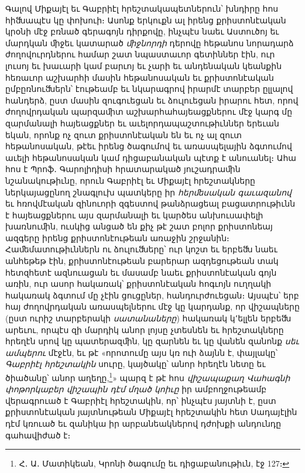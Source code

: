 \documentclass{article}
\begin{document}
{Գալով Միքայէլ եւ Գաբրիէլ հրեշտակապետներուն՝ խնդիրը հոս հիﬓապէս կը փոխուի։ Ասոնք երկուքն ալ իրենց քրիստոնէական կրօնի մէջ բռնած գերագոյն դիրքովը, ինչպէս նաեւ Աստուծոյ եւ մարդկան ﬕջեւ կատարած \emph{ﬕջնորդի} դերովը հեթանոս նորադարձ ժողովուրդներու համար շատ նպաստաւոր գետիններ էին, ուր լուսոյ եւ խաւարի կամ բարւոյ եւ չարի եւ անդենական կեանքին հեռաւոր աշխարհի մասին հեթանոսական եւ քրիստոնէական ըմբըռնուﬓերն՝ էութեամբ եւ նկարագրով իրարմէ տարբեր ըլլալով հանդերձ, ըստ մասին զուգուեցան եւ ձուլուեցան իրարու հետ, որով ժողովրդական պարզաﬕտ աշխարհահայեացքներու մէջ կարգ մը զարմանալի հայեացքներ եւ աւելորդապաշտութիւններ երեւան եկան, որոնք ոչ զուտ քրիստոնէական են եւ ոչ ալ զուտ հեթանոսական, թէեւ իրենց ծագումով եւ առասպելային ձգտումով աւելի հեթանոսական կամ դիցաբանական պէտք է անուանել։ Ահա հոս է Պրոֆ․ Գարոլիդիսի հրատարակած յուշադրաﬕն նշանակութիւնը, որուն Գաբրիէլ եւ Միքայէլ հրեշտակները ներկայացընող շնագլուխ պատկերը իր \emph{հերﬔսական գաւազանով} եւ հռովմէական զինուորի զգեստով թանձրացեալ բացատրութիւնն է հայեացքներու այս զարմանալի եւ կարծես անխուսափելի խառնուﬕն, ուսկից անցած են քիչ թէ շատ բոլոր քրիստոնեայ ազգերը իրենց քրիստոնէութեան առաջին շրջանին։ Հաﬔմատութիւններն ու ձուլուﬓերը՝ ուր կոշտ եւ երբեﬓ նաեւ անհեթեթ էին, քրիստոնէութեան բարերար ազդեցութեան տակ հետզհետէ ազնուացան եւ մասամբ նաեւ քրիստոնէական գոյն առին, ուր ասոր հակառակ՝ քրիստոնէական հոգւոյն ուղղակի հակառակ ձգտում մը չէին ցուցըներ, հանդուրժուեցան։ Այսպէս՝ երբ հայ ժողովրդական առասպելներու մէջ կը կարդանք, որ վիշապները (ըստ ուրիշ տարբերակի \emph{սատանաները}) հակառակ կ՚ելլեն երբեﬓ արեւու, որպէս զի մարդիկ անոր լոյսը չտեսնեն եւ հրեշտակները հրեղէն սրով կը պատերազﬕն, կը զարնեն եւ կը վանեն զանոնք \emph{սեւ ամպերու} մէջէն, եւ թէ «որոտումը այս կռ ուի ձայնն է, փայլակը՝ \emph{Գաբրիէլ հրեշտակին} սուրը, կայծակը՝ անոր հրեղէն նետը եւ ծիածանը՝ անոր աղեղը,\footnote{Հ․ Ա․ Մատիկեան, Կրոնի ծագումը եւ դիցաբանութիւն, էջ 127։}» պարզ է թէ հոս \emph{վիշապաքաղ Վահագնի փոթորկաբեր վիշապին դէմ մղած կոիւը} իր ամբողջութեամբ վերագրուած է Գաբրիէլ հրեշտակին, որ՝ ինչպէս յայտնի է, ըստ քրիստոնէական յայտնութեան Միքայէլ հրեշտակին հետ Սադայէլին դէմ կռուած եւ զանիկա իր արբանեակներով դժոխքի անդունդը գահավիժած է։

}
\end{document}
